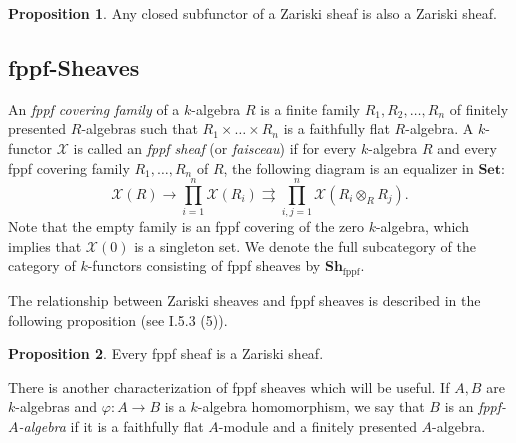 \documentclass[oneside,11pt]{amsart}
\newcommand{\bSet}{\ensuremath{\textbf{Set}}}
\newcommand{\bSh}{\ensuremath{\textbf{Sh}}}
\newcommand{\mX}{\ensuremath{\mathcal{X}}}
\newcommand{\fppf}{\ensuremath{\text{fppf}}}
\theoremstyle{definition}
\newtheorem{proof techniques}{Proof Techniques}
\newtheorem{proposition}{Proposition}
\begin{document}
\begin{proposition}\label{prop: closed subfunctors of zariski sheaves are zariski sheaves}
Any closed subfunctor of a Zariski sheaf is also a Zariski sheaf. 
\end{proposition}


\subsection{fppf-Sheaves}

An \emph{fppf covering family} of a $k$-algebra $R$ is a finite family $R_1 , R_2, \ldots, R_n$ of finitely presented $R$-algebras such that $R_1 \times \ldots \times R_n$ is a faithfully flat $R$-algebra. A $k$-functor $\mX$ is called an \emph{fppf sheaf} (or \emph{faisceau}) if for every $k$-algebra $R$ and every fppf covering family $R_1, \ldots, R_n$ of $R$, the following diagram is an equalizer in $\bSet$:
\begin{equation*}
\mX( R ) \to \prod_{i = 1}^n \mX(R_i) \rightrightarrows \prod_{i , j = 1}^n \mX(R_i \otimes_R R_j).
\end{equation*}
Note that the empty family is an fppf covering of the zero $k$-algebra, which implies that $\mX(0)$ is a singleton set. We denote the full subcategory of the category of $k$-functors consisting of fppf sheaves by $\bSh_{\fppf}$. 

The relationship between Zariski sheaves and fppf sheaves is described in the following proposition (see \cite{jantzen2003} I.5.3 (5)).

\begin{proposition}\label{prop: fppf sheaves are zariski sheaves}
Every fppf sheaf is a Zariski sheaf. 
\end{proposition}

There is another characterization of fppf sheaves which will be useful. If $A, B$ are $k$-algebras and $\varphi : A \to B$ is a $k$-algebra homomorphism, we say that $B$ is an \emph{fppf-$A$-algebra} if it is a faithfully flat $A$-module and a finitely presented $A$-algebra.  
\end{document}

